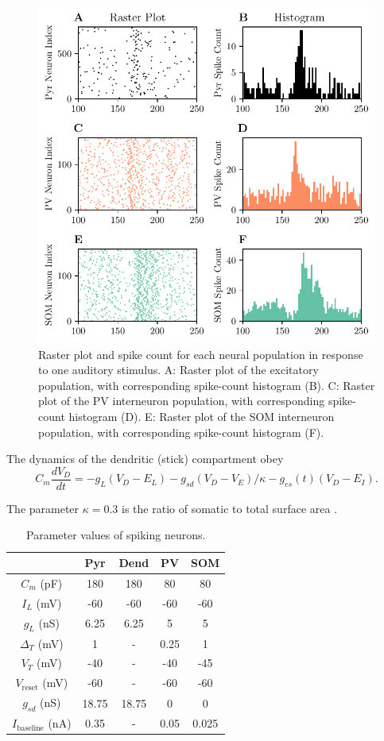 \documentclass[a4paper,10pt]{article}
\begin{document}
\begin{figure}[ht!]
 \centering
 \includegraphics[width=.75\textwidth]{spike_responses.pdf}
 \caption{Raster plot and spike count for each neural population in response to one auditory stimulus. A: Raster plot of the excitatory population, with corresponding spike-count histogram (B). C: Raster plot of the PV interneuron population, with corresponding spike-count histogram (D). E: Raster plot of the SOM interneuron population, with corresponding spike-count histogram (F).}
\end{figure}


The dynamics of the dendritic (stick) compartment obey
\begin{equation*}
 C_m \frac{dV_D}{dt} =  -g_L(V_D-E_L) - g_{sd}(V_D-V_E)/\kappa-g_{es}(t)(V_D-E_I).
\end{equation*}

The parameter $\kappa=0.3$ is the ratio of somatic to total surface area \cite{}.


\begin{table}
\caption{Parameter values of spiking neurons.}\label{tab:spike}
\centering
\begin{tabular}{ c|c|c|c|c } 
       & Pyr & Dend & PV & SOM\\ 
 \hline
 $C_m$ (pF) & 180  & 180  & 80  & 80 \\
 $I_L$ (mV) & -60  & -60  & -60 & -60 \\ 
 $g_L$ (nS) & 6.25 & 6.25 & 5   & 5 \\
 $\Delta_T$ (mV) & 1 & - & 0.25 & 1\\
 $V_T$ (mV) & -40 & - & -40 & -45\\
 $V_\text{reset}$ (mV) & -60 & - & -60 & -60\\
 $g_{sd}$ (nS) & 18.75 & 18.75 & 0 & 0\\
 $I_\text{baseline}$ (nA) & 0.35 & - & 0.05 & 0.025
\end{tabular}
\end{table}
\end{document}
